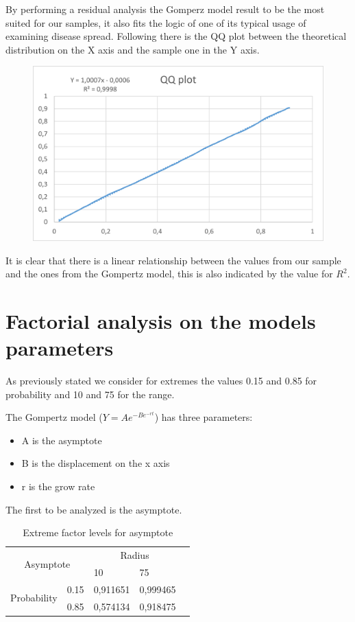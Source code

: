 By performing a residual analysis the Gomperz model result to be the most suited for our samples, it also fits the logic of one of its typical usage of examining disease spread. Following there is the QQ plot between the theoretical distribution on the X axis and the sample one in the Y axis.

\begin{figure}[H]
\centering
    \includegraphics[width= 1\textwidth]{./images/QQPlot200.png}
\end{figure}

It is clear that there is a linear relationship between the values from our sample and the ones from the Gompertz model, this is also indicated by the value for $R^2$.

\section{Factorial analysis on the models parameters}
As previously stated we consider for extremes the values 0.15 and 0.85 for probability and 10 and 75 for the range.

The Gompertz model ($ Y = Ae^{-Be^{-rt}} $) has three parameters:
\begin{itemize}
	\item A is the asymptote
	\item B is the displacement on the x axis
	\item r is the grow rate
\end{itemize}
The first to be analyzed is the asymptote.


\begin{table}[H]
\centering
\begin{tabular}{|cl|ll|l}
\cline{1-4}
\multicolumn{2}{|c|}{\multirow{2}{*}{Asymptote}}        & \multicolumn{2}{c|}{Radius}              &  \\ \cline{3-4}
\multicolumn{2}{|c|}{}                                  & \multicolumn{1}{l|}{10}       & 75       &  \\ \cline{1-4}
\multicolumn{1}{|c|}{\multirow{2}{*}{Probability}} & 0.15 & \multicolumn{1}{l|}{0,911651} & 0,999465 &  \\ \cline{2-4}
\multicolumn{1}{|c|}{}                             & 0.85 & \multicolumn{1}{l|}{0,574134} & 0,918475 &  \\ \cline{1-4}
\end{tabular}
\caption{Extreme factor levels for asymptote}
\end{table}


